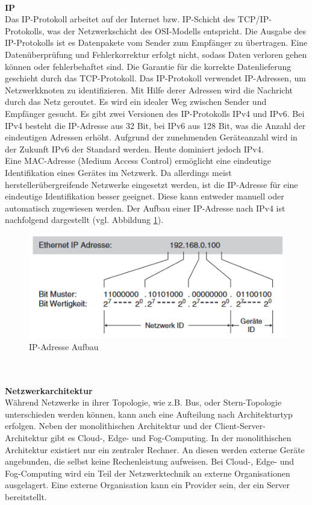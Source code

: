 \documentclass[ a4paper,
                oneside,
                toc=bibliography,
                toc=listof
                ]{scrbook}
\begin{document}
	\\
	\textbf{IP} \\
	Das IP-Protokoll arbeitet auf der Internet bzw. IP-Schicht des TCP/IP-Protokolls, was der Netzwerkschicht des OSI-Modells entspricht. Die Ausgabe des IP-Protokolls ist es Datenpakete vom Sender zum Empfänger zu übertragen. Eine Datenüberprüfung und Fehlerkorrektur erfolgt nicht, sodass Daten verloren gehen können oder fehlerbehaftet sind. Die Garantie für die korrekte Datenlieferung geschieht durch das TCP-Protokoll. Das IP-Protokoll verwendet IP-Adressen, um Netzwerkknoten zu identifizieren. Mit Hilfe derer Adressen wird die Nachricht durch das Netz geroutet. Es wird ein idealer Weg zwischen Sender und Empfänger gesucht. \cite{harnisch2009netzwerktechnik} \cite{riggert2002rechnernetze} Es gibt zwei Versionen des IP-Protokolls IPv4 und IPv6. Bei IPv4 besteht die IP-Adresse aus 32 Bit, bei IPv6 aus 128 Bit, was die Anzahl der eindeutigen Adressen erhöht. Aufgrund der zunehmenden Geräteanzahl wird in der Zukunft IPv6 der Standard werden. Heute dominiert jedoch IPv4. \cite{riggert2002rechnernetze} \\
	Eine MAC-Adresse (Medium Access Control) ermöglicht eine eindeutige Identifikation eines Gerätes im Netzwerk. Da allerdings meist herstellerübergreifende Netzwerke eingesetzt werden, ist die IP-Adresse für eine eindeutige Identifikation besser geeignet. Diese kann entweder manuell oder automatisch zugewiesen werden. Der Aufbau einer IP-Adresse nach IPv4 ist nachfolgend dargestellt (vgl. Abbildung \ref{fig:IP-Adresse}).  \cite{hering2012elektrotechnik}
   	\begin{figure}[!ht]
   		\centering
   		\includegraphics[width=0.70\linewidth]{./images/IP Adresse Aufbau.png}
   		\caption{IP-Adresse Aufbau \cite{hering2012elektrotechnik}} 
   		\label{fig:IP-Adresse}
   	\end{figure}
   	\\
   	\\
   	\textbf{Netzwerkarchitektur}\\
   	Während Netzwerke in ihrer Topologie, wie z.B. Bus, oder Stern-Topologie unterschieden werden können, kann auch eine Aufteilung nach Architekturtyp erfolgen. Neben der monolithischen Architektur und der Client-Server-Architektur gibt es Cloud-, Edge- und Fog-Computing. In der monolithischen Architektur existiert nur ein zentraler Rechner. An diesen werden externe Geräte angebunden, die selbst keine Rechenleistung aufweisen. Bei Cloud-, Edge- und Fog-Computing wird ein Teil der Netzwerktechnik an externe Organisationen ausgelagert. Eine externe Organisation kann ein Provider sein, der ein Server bereitstellt. \\
\end{document}
